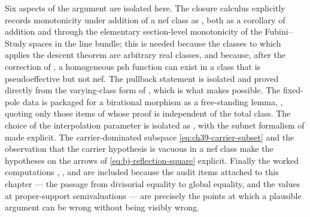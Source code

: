 Six aspects of the argument are isolated here.  The closure calculus
explicitly records
monotonicity under addition of a nef class as
, both as a corollary of addition and
through the elementary section-level monotonicity  of the Fubini--Study
spaces in the line bundle; this is needed because the classes to which
 applies the descent theorem are arbitrary real
classes, and because, after the correction of , a
homogeneous psh function can exist in a class that is pseudoeffective but
not nef.
The pullback statement  is isolated and proved
directly from the varying-class form of , which is what
makes  possible.  The fixed-pole data is
packaged for a birational morphism as a free-standing lemma,
, quoting only those items of
 whose proof is independent of the total class.
The choice of the interpolation parameter is isolated as
, with the subnet formalism of
 made explicit.  The
carrier-dominated subspace \eqref{eq:ch39-carrier-subset} and the
observation  that the carrier hypothesis is
vacuous in a nef class make the hypotheses on the arrows of
\eqref{eq:bj-reflection-square} explicit.
Finally the worked computations
,
,
 and
 are included because the
audit items attached to this chapter --- the passage from divisorial
equality to global equality, and the values at proper-support
semivaluations --- are precisely the points at which a plausible argument
can be wrong without being visibly wrong.
